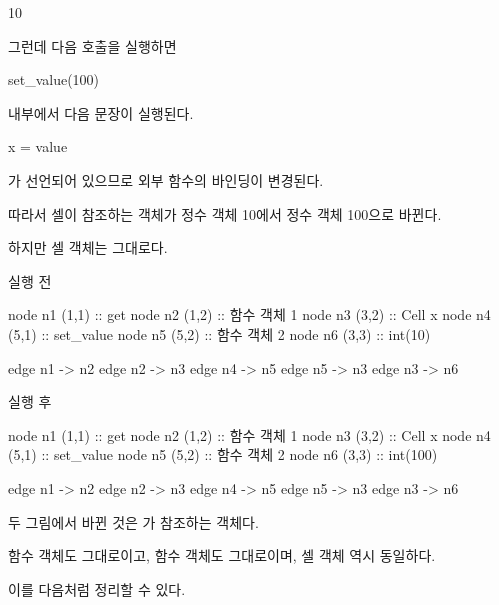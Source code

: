 \begin{dhkzsh}
10
\end{dhkzsh}

그런데 다음 호출을 실행하면

\begin{dhkcode}
set_value(100)
\end{dhkcode}

 내부에서 다음 문장이 실행된다.

\begin{dhkcode}
x = value
\end{dhkcode}

가 선언되어 있으므로 외부 함수의  바인딩이 변경된다.

따라서 셀이 참조하는 객체가 정수 객체 10에서 정수 객체 100으로 바뀐다.

하지만 셀 객체는 그대로다.

\begin{dhknote}
\begin{dhksmry}[centered]
실행 전
\end{dhksmry}
\end{dhknote}

\begin{dhkdiagram}[in=6]
node n1 (1,1) :: get
node n2 (1,2) :: 함수 객체 1
node n3 (3,2) :: Cell x
node n4 (5,1) :: set_value
node n5 (5,2) :: 함수 객체 2
node n6 (3,3) :: int(10)

edge n1 -> n2
edge n2 -> n3
edge n4 -> n5
edge n5 -> n3
edge n3 -> n6
\end{dhkdiagram}

\begin{dhknote}
\begin{dhksmry}[centered]
실행 후
\end{dhksmry}
\end{dhknote}

\begin{dhkdiagram}[in=6]
node n1 (1,1) :: get
node n2 (1,2) :: 함수 객체 1
node n3 (3,2) :: Cell x
node n4 (5,1) :: set_value
node n5 (5,2) :: 함수 객체 2
node n6 (3,3) :: int(100)

edge n1 -> n2
edge n2 -> n3
edge n4 -> n5
edge n5 -> n3
edge n3 -> n6
\end{dhkdiagram}

두 그림에서 바뀐 것은 가 참조하는 객체다.

 함수 객체도 그대로이고,  함수 객체도 그대로이며, 셀 객체 역시 동일하다.

이를 다음처럼 정리할 수 있다.

